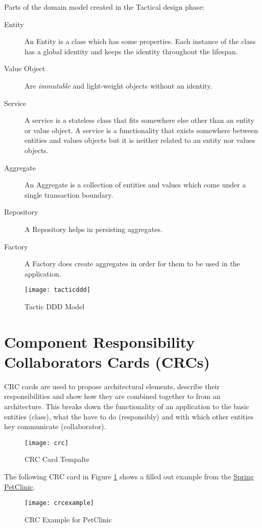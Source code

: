 Parts of the domain model created in the Tactical design phase:
\begin{description}
  \item [Entity] An Entity is a class which has some properties. Each instance of the class has a global identity and keeps the identity throughout the lifespan.
  \item [Value Object] Are \textit{immutable} and light-weight objects without an identity.
  \item [Service] A service is a stateless class that fits somewhere else other than an entity or value object. A service is a functionality that exists somewhere between entities and values objects but it is neither related to an entity nor values objects.
  \item [Aggregate] An Aggregate is a collection of entities and values which come under a single transaction boundary.
  \item [Repository] A Repository helps in persisting aggregates.
  \item [Factory] A Factory does create aggregates in order for them to be used in the application.
\end{description}

\begin{figure}[H]
  \center
  \texttt{[image: tacticddd]}
  \caption{Tactic DDD Model}
\end{figure}

\section{Component Responsibility Collaborators Cards (CRCs)}
CRC cards are used to propose architectural elements, describe their responsibilities and show how they are combined together to from an architecture. This breaks down the functionality of an application to the basic entities (class), what the have to do (responsibly) and with which other entities hey communicate (collaborator).

\begin{figure}[H]
  \center
  \texttt{[image: crc]}
  \caption{CRC Card Tempalte}
\end{figure}

The following CRC card in Figure \ref{fig:crcexample} shows a filled out example from the \href{https://spring-petclinic.github.io/}{Spring PetClinic}.

\begin{figure}[H]
  \center
  \texttt{[image: crcexample]}
  \caption{CRC Example for PetClinic}
  \label{fig:crcexample}
\end{figure}

